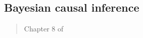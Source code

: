 \documentclass[12pt]{article}
\begin{document}
\begin{verse}  \end{verse}

\begin{verse}  \end{verse}

\begin{verse}  \end{verse}

\begin{verse}  \end{verse}

\subsection{Bayesian causal inference}

\begin{verse}  \end{verse}

\begin{verse} Chapter 8 of  \end{verse}

\begin{verse}  \end{verse}

\begin{verse}  \end{verse}

\begin{verse}  \end{verse}

\clearpage


\clearpage

\end{document}
